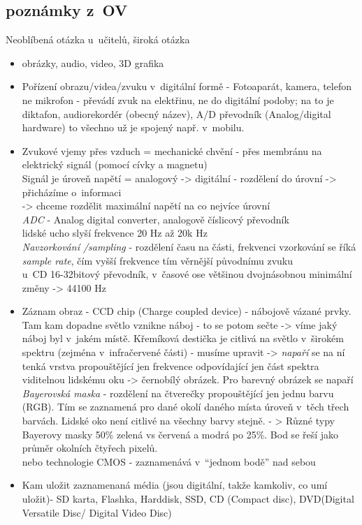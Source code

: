 \documentclass[12pt]{article}
\begin{document}
\subsection{poznámky z~OV}
Neoblíbená otázka u~učitelů, široká otázka
\begin{itemize}
\item obrázky, audio, video, 3D grafika
\item Pořízení obrazu/videa/zvuku v~digitální formě - Fotoaparát, kamera, telefon\\
ne mikrofon - převádí zvuk na elektřinu, ne do digitální podoby; na to je diktafon, audiorekordér (obecný název), A/D převodník (Analog/digital hardware) to všechno už je spojený např. v~mobilu.
\item Zvukové vjemy přes vzduch = mechanické chvění - přes membránu na elektrický signál (pomocí cívky a magnetu)\\
Signál je úroveň napětí = analogový -> digitální - rozdělení do úrovní -> přicházíme o~informaci\\
-> chceme rozdělit maximální napětí na co nejvíce úrovní\\
\emph{ADC} - Analog digital converter, analogově číslicový převodník\\
lidské ucho slyší frekvence 20 Hz až 20k Hz \\
\emph{Navzorkování /sampling} - rozdělení času na části, frekvenci vzorkování se říká \emph{sample rate}, čím vyšší frekvence tím věrnější původnímu zvuku\\
u~CD 16-32bitový převodník, v~časové ose většinou dvojnásobnou minimální změny -> 44100 Hz
\item Záznam obraz - CCD chip (Charge coupled device) - nábojově vázané prvky.  Tam kam dopadne světlo vznikne náboj - to se potom sečte -> víme jaký náboj byl v~jakém místě. Křemíková destička je citlivá na světlo v~širokém spektru (zejména v~infračervené části) - musíme upravit -> \emph{napaří} se na ní tenká vrstva propouštějící jen frekvence odpovídající jen část spektra viditelnou lidskému oku -> černobílý obrázek. Pro barevný obrázek se napaří \emph{Bayerovská maska} - rozdělení na čtverečky propouštějící jen jednu barvu (RGB). Tím se zaznamená pro dané okolí daného místa úroveň v~těch třech barvách. Lidské oko není citlivé na všechny barvy stejně. - > Různé typy Bayerovy masky 50\% zelená vs červená a modrá po 25\%. Bod se řeší jako průměr okolních čtyřech pixelů.\\
nebo technologie CMOS - zaznamenává v~``jednom bodě'' nad sebou
\item Kam uložit zaznamenaná média (jsou digitální, takže kamkoliv, co umí uložit)- SD karta, Flashka, Harddisk, SSD, CD (Compact disc), DVD(Digital Versatile Disc/ Digital Video Disc)\\

\end{itemize}
\end{document}
